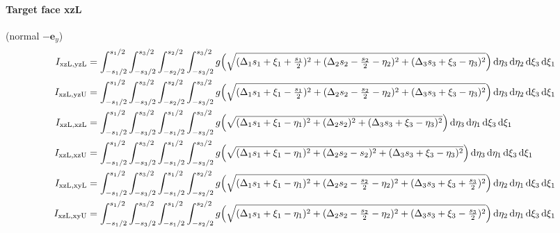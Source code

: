 \paragraph{Target face xzL} (normal $-\mathbf{e}_y$)
\begin{align*}
I_{\mathrm{xzL},\mathrm{yzL}} &= \int_{-s_1/2}^{s_1/2}\int_{-s_3/2}^{s_3/2}\int_{-s_2/2}^{s_2/2}\int_{-s_3/2}^{s_3/2} g\Bigl(\sqrt{(\Delta_1 s_1 + \xi_1 + \tfrac{s_1}{2})^2 + (\Delta_2 s_2 - \tfrac{s_2}{2} - \eta_2)^2 + (\Delta_3 s_3 + \xi_3 - \eta_3)^2}\Bigr)\,\mathrm{d}\eta_3\,\mathrm{d}\eta_2\,\mathrm{d}\xi_3\,\mathrm{d}\xi_1 \\I_{\mathrm{xzL},\mathrm{yzU}} &= \int_{-s_1/2}^{s_1/2}\int_{-s_3/2}^{s_3/2}\int_{-s_2/2}^{s_2/2}\int_{-s_3/2}^{s_3/2} g\Bigl(\sqrt{(\Delta_1 s_1 + \xi_1 - \tfrac{s_1}{2})^2 + (\Delta_2 s_2 - \tfrac{s_2}{2} - \eta_2)^2 + (\Delta_3 s_3 + \xi_3 - \eta_3)^2}\Bigr)\,\mathrm{d}\eta_3\,\mathrm{d}\eta_2\,\mathrm{d}\xi_3\,\mathrm{d}\xi_1 \\I_{\mathrm{xzL},\mathrm{xzL}} &= \int_{-s_1/2}^{s_1/2}\int_{-s_3/2}^{s_3/2}\int_{-s_1/2}^{s_1/2}\int_{-s_3/2}^{s_3/2} g\Bigl(\sqrt{(\Delta_1 s_1 + \xi_1 - \eta_1)^2 + (\Delta_2 s_2)^2 + (\Delta_3 s_3 + \xi_3 - \eta_3)^2}\Bigr)\,\mathrm{d}\eta_3\,\mathrm{d}\eta_1\,\mathrm{d}\xi_3\,\mathrm{d}\xi_1 \\I_{\mathrm{xzL},\mathrm{xzU}} &= \int_{-s_1/2}^{s_1/2}\int_{-s_3/2}^{s_3/2}\int_{-s_1/2}^{s_1/2}\int_{-s_3/2}^{s_3/2} g\Bigl(\sqrt{(\Delta_1 s_1 + \xi_1 - \eta_1)^2 + (\Delta_2 s_2 - s_2)^2 + (\Delta_3 s_3 + \xi_3 - \eta_3)^2}\Bigr)\,\mathrm{d}\eta_3\,\mathrm{d}\eta_1\,\mathrm{d}\xi_3\,\mathrm{d}\xi_1 \\I_{\mathrm{xzL},\mathrm{xyL}} &= \int_{-s_1/2}^{s_1/2}\int_{-s_3/2}^{s_3/2}\int_{-s_1/2}^{s_1/2}\int_{-s_2/2}^{s_2/2} g\Bigl(\sqrt{(\Delta_1 s_1 + \xi_1 - \eta_1)^2 + (\Delta_2 s_2 - \tfrac{s_2}{2} - \eta_2)^2 + (\Delta_3 s_3 + \xi_3 + \tfrac{s_3}{2})^2}\Bigr)\,\mathrm{d}\eta_2\,\mathrm{d}\eta_1\,\mathrm{d}\xi_3\,\mathrm{d}\xi_1 \\I_{\mathrm{xzL},\mathrm{xyU}} &= \int_{-s_1/2}^{s_1/2}\int_{-s_3/2}^{s_3/2}\int_{-s_1/2}^{s_1/2}\int_{-s_2/2}^{s_2/2} g\Bigl(\sqrt{(\Delta_1 s_1 + \xi_1 - \eta_1)^2 + (\Delta_2 s_2 - \tfrac{s_2}{2} - \eta_2)^2 + (\Delta_3 s_3 + \xi_3 - \tfrac{s_3}{2})^2}\Bigr)\,\mathrm{d}\eta_2\,\mathrm{d}\eta_1\,\mathrm{d}\xi_3\,\mathrm{d}\xi_1
\end{align*}
